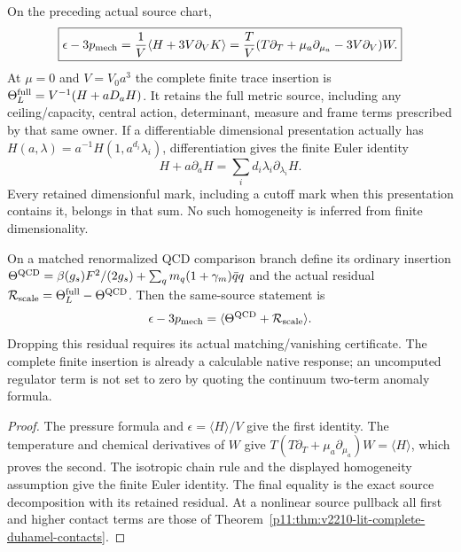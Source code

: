 \documentclass[12pt,a4paper]{article}
\begin{document}
\begin{theorem}
\label{p11:thm:thermal-trace-anomaly-operator-closure}
On the preceding actual source chart,
\begin{equation}
\label{p11:eq:thermal-trace-anomaly-operator-closure}
 \boxed{\epsilon-3p_{\rm mech}
 ={1\over V}\langle H+3V\partial_VK\rangle
 ={T\over V}(T\partial_T+\mu_a\partial_{\mu_a}-3V\partial_V)W.}
\end{equation}
At $\mu=0$ and $V=V_0a^3$ the complete finite trace insertion is
$\Theta_L^{\rm full}=V^{-1}(H+aD_aH)$. It retains the full metric source,
including any ceiling/capacity, central action, determinant, measure and
frame terms prescribed by that same owner. If a differentiable dimensional
presentation actually has
$H(a,\lambda)=a^{-1}H(1,a^{d_i}\lambda_i)$, differentiation gives the
finite Euler identity
\[
 H+a\partial_aH=\sum_i d_i\lambda_i\partial_{\lambda_i}H.
\]
Every retained dimensionful mark, including a cutoff mark when this
presentation contains it, belongs in that sum. No such homogeneity is inferred
from finite dimensionality.

On a matched renormalized QCD comparison branch define its ordinary insertion
$\Theta^{\rm QCD}=\beta(g_s)F^2/(2g_s)+
\sum_qm_q(1+\gamma_m)\bar q q$ and the actual residual
$\mathcal R_{\rm scale}=\Theta_L^{\rm full}-\Theta^{\rm QCD}$.
Then the same-source statement is
\[
 \epsilon-3p_{\rm mech}
 =\langle\Theta^{\rm QCD}+\mathcal R_{\rm scale}\rangle.
\]
Dropping this residual requires its actual matching/vanishing certificate.
The complete finite insertion is already a calculable native response;
an uncomputed regulator term is not set to zero by quoting the continuum
two-term anomaly formula.
\end{theorem}
\begin{proof}
The pressure formula and $\epsilon=\langle H\rangle/V$ give the first
identity. The temperature and chemical derivatives of $W$ give
$T(T\partial_T+\mu_a\partial_{\mu_a})W=\langle H\rangle$,
which proves the second. The isotropic chain rule and the displayed
homogeneity assumption give the finite Euler identity. The final equality
is the exact source decomposition with its retained residual. At a nonlinear
source pullback all first and higher contact terms are those of
Theorem~\ref{p11:thm:v2210-lit-complete-duhamel-contacts}.
\end{proof}
\end{document}
